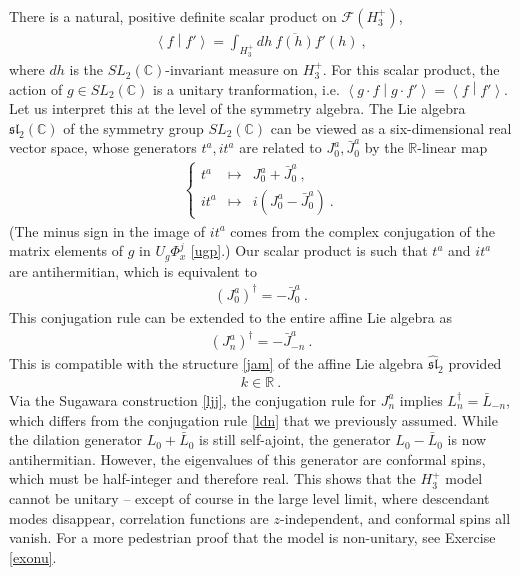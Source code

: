 \documentclass[12pt, a4paper, notitlepage, twoside]{report}
\numberwithin{equation}{section}
\theoremstyle{break}
\begin{document}
There is a natural, positive definite scalar product on $\mathcal{F}(H_3^+)$, 
\begin{align}
 \left\langle f \middle| f' \right\rangle = \int_{H_3^+} dh\ \overline{f(h)} f'(h)\ ,
\end{align}
where $dh$ is the $SL_2({\mathbb{C}})$-invariant measure on $H_3^+$.
For this scalar product, the action of $g\in SL_2({\mathbb{C}})$ is a unitary tranformation, i.e. $\left\langle g\cdot f \middle| g\cdot f'\right\rangle = \left\langle f \middle| f'\right\rangle $.
Let us interpret this at the level of the symmetry algebra.
The Lie algebra $\mathfrak{sl}_2({\mathbb{C}})$ of the symmetry group $SL_2({\mathbb{C}})$ can be viewed as a six-dimensional real vector space, whose generators $t^a,it^a$ are related to $J^a_0, \bar{J}^a_0$ by the ${\mathbb{R}}$-linear map
\begin{align}
 \left\{\begin{array}{lcl} t^a & \mapsto & J_0^a + \bar{J}_0^a \ ,  \\ it^a & \mapsto & i(J^a_0 - \bar{J}^a_0)\ . \end{array}\right. 
\end{align}
(The minus sign in the image of $it^a$ comes from the complex conjugation of the matrix elements of $g$ in $U_g\Phi^j_{x}$ \eqref{ugp}.)
Our scalar product is such that $t^a$ and $it^a$ are antihermitian, which is equivalent to
\begin{align}
 (J^a_0)^\dagger = -\bar{J}^a_0\ .
\label{jzd}
\end{align}
This conjugation rule can be extended to the entire affine Lie algebra as 
\begin{align}
 \boxed{(J^a_n)^\dagger = -\bar{J}^a_{-n}}\ .
\label{jdj}
\end{align}
This is compatible with the structure \eqref{jam} of the affine Lie algebra $\hat{\mathfrak{sl}}_2$ provided 
\begin{align}
 k\in\mathbb{R}\ .
\label{kir}
\end{align}
Via the Sugawara construction \eqref{ljj}, the conjugation rule for $J^a_n$ implies $L_n^\dagger = \bar{L}_{-n}$, which differs from the conjugation rule \eqref{ldn} that we previously assumed. While the dilation generator $L_0+\bar L_0$ is still self-ajoint, the generator $L_0-\bar L_0$ is now antihermitian. However, the eigenvalues of this generator are conformal spins, which must be half-integer and therefore real. This shows that the $H_3^+$ model cannot be unitary -- except of course in the large level limit, where descendant modes disappear, correlation functions are $z$-independent, and conformal spins all vanish. For a more pedestrian proof that the model is non-unitary, see Exercise \ref{exonu}.
\end{document}
